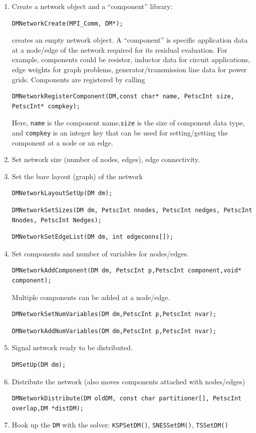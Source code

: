 {\begin{enumerate}
  \item Create a network object and a ``component'' library:
\begin{lstlisting}
DMNetworkCreate(MPI_Comm, DM*);
\end{lstlisting}
  creates an empty network object. A ``component'' is specific application data at a node/edge of the network required for its residual evaluation. For example, components could be resistor, inductor data for circuit applications, edge weights for graph problems, generator/transmission line data for power grids. Components are registered by calling
\begin{lstlisting}
DMNetworkRegisterComponent(DM,const char* name, PetscInt size, PetscInt* compkey);
\end{lstlisting}
  Here, \lstinline{name} is the component name,\lstinline{size} is the size of component data type, and \lstinline{compkey} is an integer key that can be used for
  setting/getting the component at a node or an edge.
  \item Set network size (number of nodes, edges), edge connectivity.
  \item Set the bare layout (graph) of the network
\begin{lstlisting}
DMNetworkLayoutSetUp(DM dm);
\end{lstlisting}
\begin{lstlisting}
DMNetworkSetSizes(DM dm, PetscInt nnodes, PetscInt nedges, PetscInt Nnodes, PetscInt Nedges);
\end{lstlisting}
\begin{lstlisting}
DMNetworkSetEdgeList(DM dm, int edgeconns[]);
\end{lstlisting}
  \item Set components and number of variables for nodes/edges.
\begin{lstlisting}
DMNetworkAddComponent(DM dm, PetscInt p,PetscInt component,void* component);
\end{lstlisting}
  Multiple components can be added at a node/edge.
\begin{lstlisting}
DMNetworkSetNumVariables(DM dm,PetscInt p,PetscInt nvar);
\end{lstlisting}
\begin{lstlisting}
DMNetworkAddNumVariables(DM dm,PetscInt p,PetscInt nvar);
\end{lstlisting}
  \item Signal network ready to be distributed.
\begin{lstlisting}
DMSetUp(DM dm);
\end{lstlisting}
  \item Distribute the network (also moves components attached with nodes/edges)
\begin{lstlisting}
DMNetworkDistribute(DM oldDM, const char partitioner[], PetscInt overlap,DM *distDM);
\end{lstlisting}
\item Hook up the \lstinline{DM} with the solver: \lstinline{KSPSetDM()}, \lstinline{SNESSetDM()}, \lstinline{TSSetDM()}
\end{enumerate}

}
